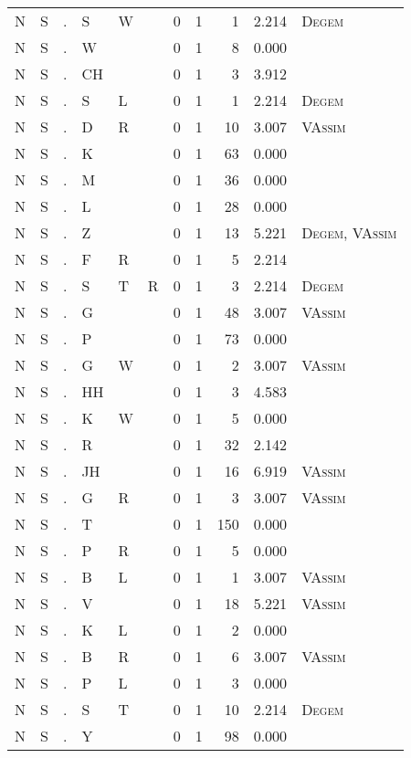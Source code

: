 \begin{longtable}{r@{ } r@{ } c@{ } l@{ } l@{ } l@{ } r r r r l }
N & S & . & S & W &  & 0 & 1 & 1 & 2.214 & \textsc{Degem} \\
N & S & . & W &  &  & 0 & 1 & 8 & 0.000 &  \\
N & S & . & CH &  &  & 0 & 1 & 3 & 3.912 &  \\
N & S & . & S & L &  & 0 & 1 & 1 & 2.214 & \textsc{Degem} \\
N & S & . & D & R &  & 0 & 1 & 10 & 3.007 & \textsc{VAssim} \\
N & S & . & K &  &  & 0 & 1 & 63 & 0.000 &  \\
N & S & . & M &  &  & 0 & 1 & 36 & 0.000 &  \\
N & S & . & L &  &  & 0 & 1 & 28 & 0.000 &  \\
N & S & . & Z &  &  & 0 & 1 & 13 & 5.221 & \textsc{Degem}, \textsc{VAssim} \\
N & S & . & F & R &  & 0 & 1 & 5 & 2.214 &  \\
N & S & . & S & T & R & 0 & 1 & 3 & 2.214 & \textsc{Degem} \\
N & S & . & G &  &  & 0 & 1 & 48 & 3.007 & \textsc{VAssim} \\
N & S & . & P &  &  & 0 & 1 & 73 & 0.000 &  \\
N & S & . & G & W &  & 0 & 1 & 2 & 3.007 & \textsc{VAssim} \\
N & S & . & HH &  &  & 0 & 1 & 3 & 4.583 &  \\
N & S & . & K & W &  & 0 & 1 & 5 & 0.000 &  \\
N & S & . & R &  &  & 0 & 1 & 32 & 2.142 &  \\
N & S & . & JH &  &  & 0 & 1 & 16 & 6.919 & \textsc{VAssim} \\
N & S & . & G & R &  & 0 & 1 & 3 & 3.007 & \textsc{VAssim} \\
N & S & . & T &  &  & 0 & 1 & 150 & 0.000 &  \\
N & S & . & P & R &  & 0 & 1 & 5 & 0.000 &  \\
N & S & . & B & L &  & 0 & 1 & 1 & 3.007 & \textsc{VAssim} \\
N & S & . & V &  &  & 0 & 1 & 18 & 5.221 & \textsc{VAssim} \\
N & S & . & K & L &  & 0 & 1 & 2 & 0.000 &  \\
N & S & . & B & R &  & 0 & 1 & 6 & 3.007 & \textsc{VAssim} \\
N & S & . & P & L &  & 0 & 1 & 3 & 0.000 &  \\
N & S & . & S & T &  & 0 & 1 & 10 & 2.214 & \textsc{Degem} \\
N & S & . & Y &  &  & 0 & 1 & 98 & 0.000 &  \\

\end{longtable}
